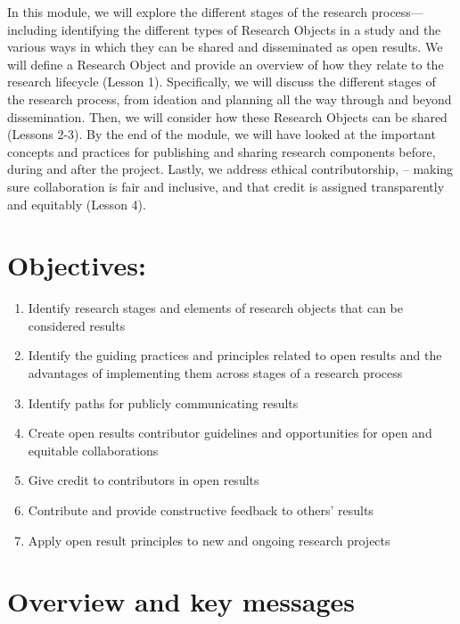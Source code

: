 \documentclass[
  letterpaper,
  DIV=11,
  numbers=noendperiod]{scrreport}
\providecommand{\tightlist}{%
  \setlength{\itemsep}{0pt}\setlength{\parskip}{0pt}}\usepackage{longtable,booktabs,array}
\begin{document}
In this module, we will explore the different stages of the research
process---including identifying the different types of Research Objects
in a study and the various ways in which they can be shared and
disseminated as open results. We will define a Research Object and
provide an overview of how they relate to the research lifecycle (Lesson
1). Specifically, we will discuss the different stages of the research
process, from ideation and planning all the way through and beyond
dissemination. Then, we will consider how these Research Objects can be
shared (Lessons 2-3). By the end of the module, we will have looked at
the important concepts and practices for publishing and sharing research
components before, during and after the project. Lastly, we address
ethical contributorship, -- making sure collaboration is fair and
inclusive, and that credit is assigned transparently and equitably
(Lesson 4).

\hypertarget{objectives}{%
\section*{Objectives:}\label{objectives}}


\begin{enumerate}
\def\labelenumi{\arabic{enumi}.}
\tightlist
\item
  Identify research stages and elements of research objects that can be
  considered results
\item
  Identify the guiding practices and principles related to open results
  and the advantages of implementing them across stages of a research
  process
\item
  Identify paths for publicly communicating results
\item
  Create open results contributor guidelines and opportunities for open
  and equitable collaborations
\item
  Give credit to contributors in open results
\item
  Contribute and provide constructive feedback to others' results
\item
  Apply open result principles to new and ongoing research projects
\end{enumerate}

\hypertarget{overview-and-key-messages}{%
\section*{Overview and key messages}\label{overview-and-key-messages}}
\end{document}
